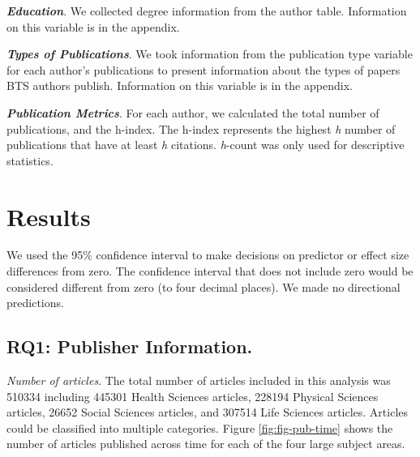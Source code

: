 \documentclass[
  man,floatsintext]{apa6}
\begin{document}
\textbf{\emph{Education}}. We collected degree information from the author table.
Information on this variable is in the appendix.

\textbf{\emph{Types of Publications}}. We took information from the publication
type variable for each author's publications to present information
about the types of papers BTS authors publish. Information on this
variable is in the appendix.

\textbf{\emph{Publication Metrics}}. For each author, we calculated the total
number of publications, and the h-index. The h-index represents the
highest \emph{h} number of publications that have at least \emph{h} citations.
\emph{h}-count was only used for descriptive statistics.

\hypertarget{results}{%
\section{Results}\label{results}}

We used the 95\% confidence interval to make decisions on predictor or
effect size differences from zero. The confidence interval that does not
include zero would be considered different from zero (to four decimal
places). We made no directional predictions.

\hypertarget{rq1-publisher-information.}{%
\subsection{RQ1: Publisher Information.}\label{rq1-publisher-information.}}

\emph{Number of articles}. The total number of articles included in this
analysis was 510334 including 445301 Health Sciences
articles, 228194 Physical Sciences articles, 26652
Social Sciences articles, and 307514 Life Sciences articles.
Articles could be classified into multiple categories. Figure
\ref{fig:fig-pub-time} shows the number of articles published across
time for each of the four large subject areas.
\end{document}

